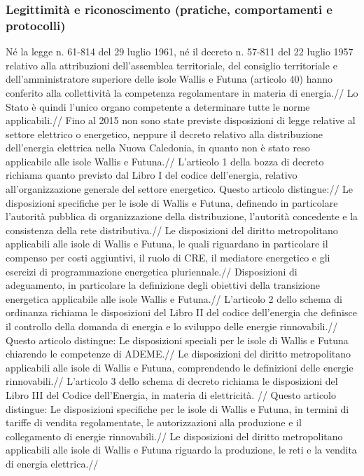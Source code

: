 \documentclass[fleqn,10pt]{SelfArx} %
\begin{document}
\subsubsection{Legittimità e riconoscimento (pratiche, comportamenti e protocolli)}
Né la legge n. 61-814 del 29 luglio 1961, né il decreto n. 57-811 del 22 luglio 1957 relativo alla attribuzioni dell'assemblea territoriale, del consiglio territoriale e dell'amministratore superiore delle isole Wallis e Futuna (articolo 40) hanno conferito alla collettività la competenza regolamentare in materia di energia.//
Lo Stato è quindi l'unico organo competente a determinare tutte le norme applicabili.//
Fino al 2015 non sono state previste disposizioni di legge relative al settore elettrico o energetico, neppure il decreto relativo alla distribuzione dell'energia elettrica nella Nuova Caledonia, in quanto non è stato reso applicabile alle isole Wallis e Futuna.//
L'articolo 1 della bozza di decreto richiama quanto previsto dal Libro I del codice dell'energia, relativo all'organizzazione generale del settore energetico. 
Questo articolo distingue://
Le disposizioni specifiche per le isole di Wallis e Futuna, definendo in particolare l'autorità pubblica di organizzazione della distribuzione, l'autorità concedente e la consistenza della rete distributiva.//
Le disposizioni del diritto metropolitano applicabili alle isole di Wallis e Futuna, le quali riguardano in particolare il compenso per costi aggiuntivi, il ruolo di CRE, il mediatore energetico e gli esercizi di programmazione energetica pluriennale.//
Disposizioni di adeguamento, in particolare la definizione degli obiettivi della transizione energetica applicabile alle isole Wallis e Futuna.//
L'articolo 2 dello schema di ordinanza richiama le disposizioni del Libro II del codice dell'energia che definisce il controllo della domanda di energia e lo sviluppo delle energie rinnovabili.// 
Questo articolo distingue:
Le disposizioni speciali per le isole di Wallis e Futuna chiarendo le competenze di ADEME.//
Le disposizioni del diritto metropolitano applicabili alle isole di Wallis e Futuna, comprendendo le definizioni delle energie rinnovabili.//
L'articolo 3 dello schema di decreto richiama le disposizioni del Libro III del Codice dell'Energia, in materia di elettricità. //
Questo articolo distingue:
Le disposizioni specifiche per le isole di Wallis e Futuna, in termini di tariffe di vendita regolamentate, le autorizzazioni alla produzione e il collegamento di energie rinnovabili.//
Le disposizioni del diritto metropolitano applicabili alle isole di Wallis e Futuna riguardo la produzione, le reti e la vendita di energia elettrica.//
\end{document}
